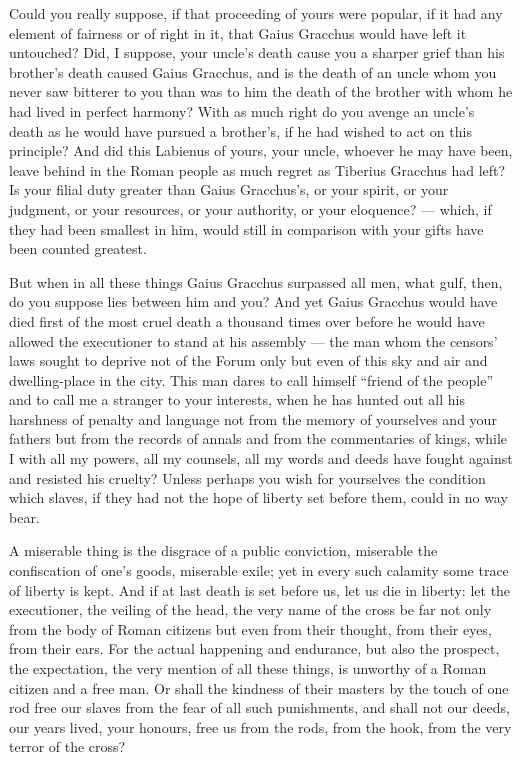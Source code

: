  Could you really suppose, if that proceeding of yours were popular, if it had any element of fairness or of right in it, that Gaius Gracchus would have left it untouched? Did, I suppose, your uncle's death cause you a sharper grief than his brother's death caused Gaius Gracchus, and is the death of an uncle whom you never saw bitterer to you than was to him the death of the brother with whom he had lived in perfect harmony? With as much right do you avenge an uncle's death as he would have pursued a brother's, if he had wished to act on this principle? And did this Labienus of yours, your uncle, whoever he may have been, leave behind in the Roman people as much regret as Tiberius Gracchus had left? Is your filial duty greater than Gaius Gracchus's, or your spirit, or your judgment, or your resources, or your authority, or your eloquence? --- which, if they had been smallest in him, would still in comparison with your gifts have been counted greatest.

 But when in all these things Gaius Gracchus surpassed all men, what gulf, then, do you suppose lies between him and you? And yet Gaius Gracchus would have died first of the most cruel death a thousand times over before he would have allowed the executioner to stand at his assembly --- the man whom the censors' laws sought to deprive not of the Forum only but even of this sky and air and dwelling-place in the city. This man dares to call himself ``friend of the people'' and to call me a stranger to your interests, when he has hunted out all his harshness of penalty and language not from the memory of yourselves and your fathers but from the records of annals and from the commentaries of kings, while I with all my powers, all my counsels, all my words and deeds have fought against and resisted his cruelty? Unless perhaps you wish for yourselves the condition which slaves, if they had not the hope of liberty set before them, could in no way bear.

 A miserable thing is the disgrace of a public conviction, miserable the confiscation of one's goods, miserable exile; yet in every such calamity some trace of liberty is kept. And if at last death is set before us, let us die in liberty: let the executioner, the veiling of the head, the very name of the cross be far not only from the body of Roman citizens but even from their thought, from their eyes, from their ears. For the actual happening and endurance, but also the prospect, the expectation, the very mention of all these things, is unworthy of a Roman citizen and a free man. Or shall the kindness of their masters by the touch of one rod free our slaves from the fear of all such punishments, and shall not our deeds, our years lived, your honours, free us from the rods, from the hook, from the very terror of the cross?

